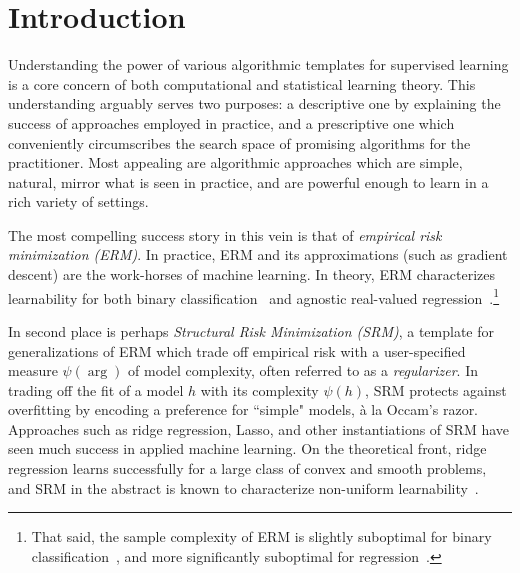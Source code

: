 \section{Introduction}\label{Section:Introduction}

Understanding the power of various algorithmic templates for supervised learning is a core concern of both computational and statistical learning theory. This understanding arguably serves two purposes: a descriptive one by explaining the success of approaches employed in practice, and a prescriptive one which conveniently circumscribes the search space of promising algorithms for the practitioner. Most appealing are algorithmic approaches which are simple, natural, mirror what is seen in practice, and are powerful enough to learn in a rich variety of settings.

The most compelling  success story in this vein is that of \emph{empirical risk minimization (ERM)}. In practice, ERM and its approximations (such as gradient descent) are the work-horses of machine learning. In theory, ERM characterizes learnability for both binary classification~\citep{vapnik1982estimation,BEHW89} and agnostic real-valued regression~\citep{alon1997scale}.\footnote{That said, the sample complexity of ERM is slightly suboptimal for binary classification~\citep{hanneke2016optimal}, and more significantly suboptimal for regression~\citep{vavskevivcius2023suboptimality}.}

In second place is perhaps \emph{Structural Risk Minimization (SRM)}, a template for generalizations of ERM which trade off empirical risk with a user-specified measure $\psi(\arg)$ of model complexity, often referred to as a \emph{regularizer}. In trading off the fit of a model $h$ with its complexity $\psi(h)$, SRM protects against overfitting by encoding a preference for ``simple" models, à la Occam's razor. Approaches such as ridge regression, Lasso, and other instantiations of SRM have seen much success in applied machine learning. On the theoretical front, ridge regression learns successfully for a large class of convex and smooth problems, and SRM in the abstract is known to characterize non-uniform learnability~\citep{shalev2014understanding}.

